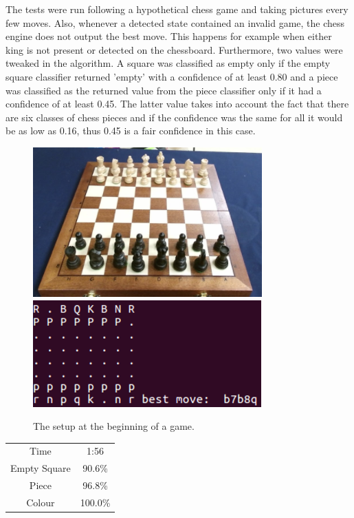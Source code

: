 \documentclass{l4proj}
\begin{document}
The tests were run following a hypothetical chess game and taking pictures every few moves. Also, whenever a detected state contained an invalid game, the chess engine does not output the best move. This happens for example when either king is not present or detected on the chessboard. Furthermore, two values were tweaked in the algorithm. A square was classified as empty only if the empty square classifier returned 'empty' with a confidence of at least 0.80 and a piece was classified as the returned value from the piece classifier only if it had a confidence of at least 0.45. The latter value takes into account the fact that there are six classes of chess pieces and if the confidence was the same for all it would be as low as 0.16, thus 0.45 is a fair confidence in this case.

\begin{figure}[h!]
\includegraphics[scale=0.8]{ts/ts1.png} \includegraphics[scale=0.75]{ts/tsd1.png}
\caption{The setup at the beginning of a game.}
\label{ts1}
\end{figure}

\begin{table}[h!]
\centering
\begin{tabular}{|c|c|}
	\hline
	Time & 1:56 \\
	\rowcolor{brown!45}Empty Square & 90.6\%  \\
	Piece & 96.8\% \\
	\rowcolor{brown!45} Colour & 100.0\% \\
	\hline
\end{tabular}
\end{table}
\end{document}

